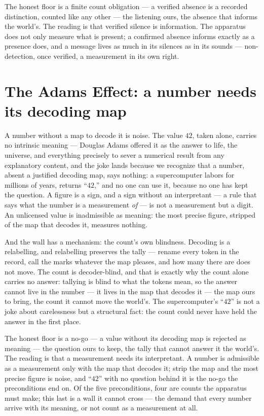 The honest floor is a finite count obligation --- a verified absence is a recorded distinction, counted like
any other --- the listening ours, the absence that informs the world's. The reading is that verified silence is
information. The apparatus does not only measure what is
present; a confirmed absence informs exactly as a presence does, and a message lives as much in its silences as
in its sounds --- non-detection, once verified, a measurement in its own right.

\section{The Adams Effect: a number needs its decoding map}
\label{se:adams}

A number without a map to decode it is noise. The value $42$, taken alone, carries no intrinsic meaning ---
Douglas Adams offered it as the answer to life, the universe, and everything precisely to sever a numerical
result from any explanatory content, and the joke lands because we recognize that a number, absent a justified
decoding map, says nothing: a supercomputer labors for millions of years, returns ``$42$,'' and no one can use
it, because no one has kept the question. A figure is a sign, and a sign without an interpretant --- a rule
that says what the number is a measurement \emph{of} --- is not a measurement but a digit. An unlicensed value
is inadmissible as meaning: the most precise figure, stripped of the map that decodes it, measures nothing.

And the wall has a mechanism: the count's own blindness. Decoding is a relabelling, and relabelling preserves
the tally --- rename every token in the record, call the marks whatever the map pleases, and how many there are
does not move. The count is decoder-blind, and that is exactly why the count alone carries no answer: tallying
is blind to what the tokens mean, so the answer cannot live in the number --- it lives in the map that decodes
it --- the map ours to bring, the count it cannot move the world's. The supercomputer's ``$42$'' is not a joke
about carelessness but a structural fact: the count could never have held the answer in the first place.

The honest floor is a no-go --- a value without its decoding map is rejected as meaning --- the question ours
to keep, the tally that cannot answer it the world's. The reading is that a
measurement needs its interpretant. A number is admissible as a measurement only with the map that decodes it;
strip the map and the most precise figure is noise, and ``$42$'' with no question behind it is the no-go the
preconditions end on. Of the five preconditions, four are counts the apparatus must make; this last is a wall it
cannot cross --- the demand that every number arrive with its meaning, or not count as a measurement at all.

